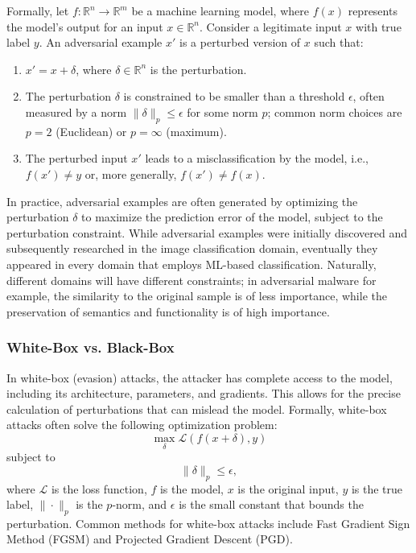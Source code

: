 Formally, let \( f: \mathbb{R}^n \to \mathbb{R}^m \) be a machine learning model, where \( f(x) \) represents the model's output for an input \( x \in \mathbb{R}^n \). Consider a legitimate input \( x \) with true label \( y \). An adversarial example \( x' \) is a perturbed version of \( x \) such that:

\begin{enumerate}
    \item \( x' = x + \delta \), where \( \delta \in \mathbb{R}^n \) is the perturbation. 
    \item The perturbation \( \delta \) is constrained to be smaller than a threshold \(\epsilon\), often measured by a norm \( \|\delta\|_p \leq \epsilon\) for some norm \( p \); common norm choices are \( p = 2 \) (Euclidean) or \( p = \infty \) (maximum).
    \item The perturbed input \( x' \) leads to a misclassification by the model, i.e., \( f(x') \neq y \) or, more generally, \( f(x') \neq f(x) \).
\end{enumerate}

In practice, adversarial examples are often generated by optimizing the perturbation \( \delta \) to maximize the  prediction error of the model, subject to the  perturbation constraint.
While adversarial examples were initially discovered and subsequently researched in the image classification domain, eventually they appeared in every domain that employs ML-based classification.
Naturally, different domains will have different constraints; in adversarial malware for example, the similarity to the original sample is of less importance, while the preservation of semantics and functionality is of high importance. 

\subsubsection{White-Box vs. Black-Box}

In white-box (evasion) attacks, the attacker has complete access to the model, including its architecture, parameters, and gradients.
This allows for the precise calculation of perturbations that can mislead the model.
Formally, white-box attacks often solve the following optimization problem:
\[
\max_{\delta} \mathcal{L}(f(x + \delta), y)
\]
subject to
\[
\|\delta\|_p \leq \epsilon,
\]
where $\mathcal{L}$ is the loss function, $f$ is the model, $x$ is the original input, $y$ is the true label, $\|\cdot\|_p$ is the $p$-norm, and $\epsilon$ is the small constant that bounds the perturbation.
Common methods for white-box attacks include Fast Gradient Sign Method (\gls{FGSM}) and Projected Gradient Descent (\gls{PGD}).

